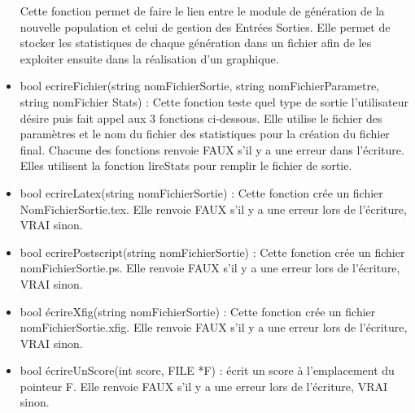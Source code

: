 \documentclass[a4paper,11pt]{article}
\begin{document}
\begin{itemize}
					Cette fonction permet de faire le lien entre le module de génération de la nouvelle population et celui de gestion des Entrées Sorties. 
					Elle permet de stocker les statistiques de chaque génération dans un fichier afin de les exploiter ensuite dans la réalisation d’un graphique.\vspace{0.2cm}
				\item bool ecrireFichier(string nomFichierSortie, string nomFichierParametre, string nomFichier Stats) : Cette fonction teste quel type de sortie l’utilisateur désire puis fait appel aux 3 fonctions ci-dessous. 
					Elle utilise le fichier des paramètres et le nom du fichier des statistiques pour la création du fichier final. 
					Chacune des fonctions renvoie FAUX s’il y a une erreur dans l’écriture. Elles utilisent la fonction lireStats pour remplir le fichier de sortie.\vspace{0.2cm}
				\item bool ecrireLatex(string nomFichierSortie) : Cette fonction crée un fichier NomFichierSortie.tex.
					Elle renvoie FAUX s’il y a une erreur lors de l’écriture, VRAI sinon.\vspace{0.2cm}
				\item bool ecrirePostscript(string nomFichierSortie)  : Cette fonction crée un fichier nomFichierSortie.ps.
					Elle renvoie FAUX s’il y a une erreur lors de l’écriture, VRAI sinon.\vspace{0.2cm}
				\item bool écrireXfig(string nomFichierSortie)  : Cette fonction crée un fichier nomFichierSortie.xfig.
					Elle renvoie FAUX s’il y a une erreur lors de l’écriture, VRAI sinon.\vspace{0.2cm}
				\item bool écrireUnScore(int score, FILE *F) : écrit un score à l’emplacement du pointeur F.
					Elle renvoie FAUX s’il y a une erreur lors de l’écriture, VRAI sinon.\\
			\end{itemize}
		
\end{document}
